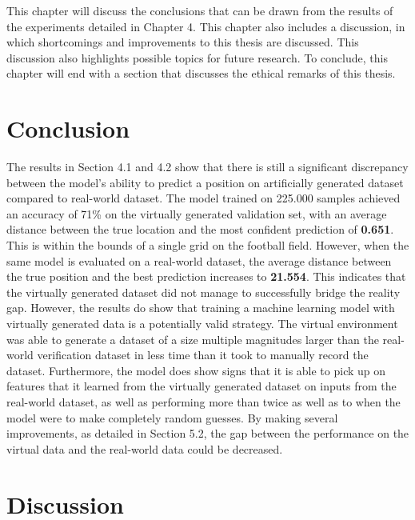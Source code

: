 \documentclass{uva-inf-bachelor-thesis}
\begin{document}
    This chapter will discuss the conclusions that can be drawn from the results of the experiments detailed in Chapter 4. This chapter also includes a discussion, in which shortcomings and improvements to this thesis are discussed. This discussion also highlights possible topics for future research. To conclude, this chapter will end with a section that discusses the ethical remarks of this thesis.
    
    \section{Conclusion}
        The results in Section 4.1 and 4.2 show that there is still a significant discrepancy between the model's ability to predict a position on artificially generated dataset compared to real-world dataset.
        The model trained on 225.000 samples achieved an accuracy of 71\% on the virtually generated validation set, with an average distance between the true location and the most confident prediction of \textbf{0.651}. This is within the bounds of a single grid on the football field. However, when the same model is evaluated on a real-world dataset, the average distance between the true position and the best prediction increases to \textbf{21.554}. This indicates that the virtually generated dataset did not manage to successfully bridge the reality gap. However, the results do show that training a machine learning model with virtually generated data is a potentially valid strategy. The virtual environment was able to generate a dataset of a size multiple magnitudes larger than the real-world verification dataset in less time than it took to manually record the dataset. Furthermore, the model does show signs that it is able to pick up on features that it learned from the virtually generated dataset on inputs from the real-world dataset, as well as performing more than twice as well as to when the model were to make completely random guesses. By making several improvements, as detailed in Section 5.2, the gap between the performance on the virtual data and the real-world data could be decreased.

    \section{Discussion}
\end{document}
